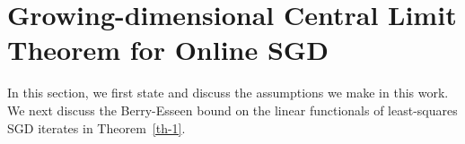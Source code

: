 \documentclass[11pt, reqno,english]{amsart}
\begin{document}








\section{Growing-dimensional Central Limit Theorem for Online SGD}\label{sec:mainres}
In this section, we first state and discuss the assumptions we make in this work. We next discuss the Berry-Esseen bound on the linear functionals of least-squares SGD iterates in Theorem~\ref{th-1}. 
\end{document}
